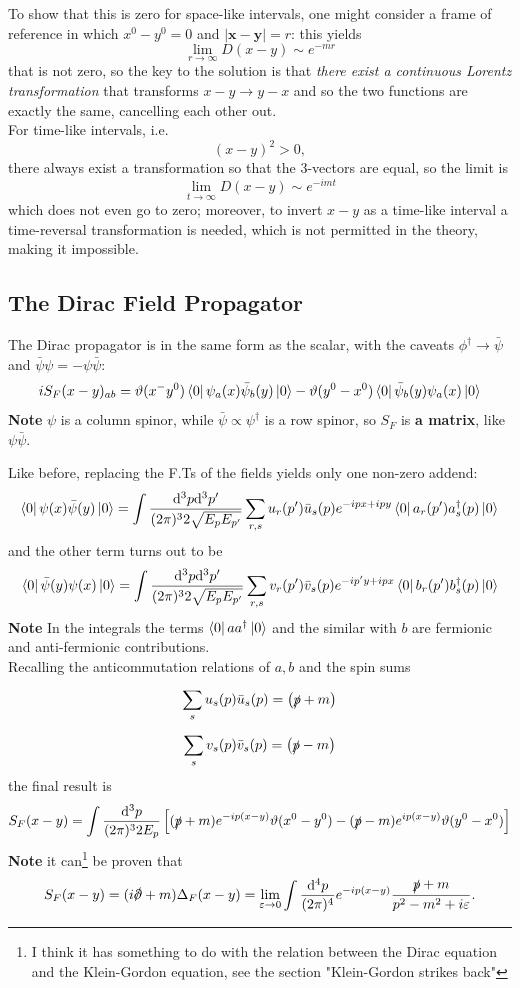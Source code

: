 To show that this is zero for space-like intervals, one might consider a frame of
reference in which $x^0-y^0=0$ and $|\mathbf{x-y}| = r$: this yields
$$\lim\limits_{r\to\infty}D(x-y)\sim e^{-mr}$$
that is not zero, so the key to the solution is that \textit{there exist a
continuous Lorentz transformation} that transforms $x-y \to y-x$ and so the
two functions are exactly the same, cancelling each other out.\\

For time-like intervals, i.e.
$$(x-y)^2>0,$$
there always exist a transformation so that the 3-vectors are equal, so the limit
is
$$\lim\limits_{t\to\infty}D(x-y)\sim e^{-imt}$$
which does not even go to zero; moreover, to invert $x-y$ as a time-like interval
a time-reversal transformation is needed, which is not permitted in the theory,
making it impossible.
\subsection{The Dirac Field Propagator}
The Dirac propagator is in the same form as the scalar, with the caveats
$\phi^\dagger\to\bar\psi$ and $\bar\psi\psi = -\psi\bar\psi$:
$$iS_F(x-y)_{ab} = \vartheta(x^-y^0)\bra{0}\psi_a(x)\bar\psi_b(y)\ket{0} - 
\vartheta(y^0-x^0)\bra{0}\bar\psi_b(y)\psi_a(x)\ket{0}$$
\textbf{Note} $\psi$ is a column spinor, while $\bar\psi\propto\psi^\dagger$ is
a row spinor, so $S_F$ is \textbf{a matrix}, like $\psi\bar\psi$.

Like before, replacing the F.Ts of the fields yields only one non-zero addend:
$$\bra{0}\psi(x)\bar\psi(y)\ket{0} =
\int \frac{\dd^3p\dd^3p'}{(2\pi)^32\sqrt{E_pE_{p'}}}\sum_{r,s}^{} u_r(p')\bar 
u_s(p)e^{-ipx+ipy}\bra{0}a_r(p')a_s^\dagger(p)\ket{0}
$$
and the other term turns out to be
$$\bra{0}\bar\psi(y)\psi(x)\ket{0} = \int \frac{\dd^3p\dd^3p'}{(2\pi)^32\sqrt{E_p
E_{p'}}}\sum_{r,s}^{}v_r(p')\bar v_s(p)e^{-ip'y+ipx}\bra{0}b_r(p')b_s^\dagger(p)
\ket{0}$$
\textbf{Note} In the integrals the terms $\bra{0}aa^\dagger\ket{0}$ and the similar
with $b$ are fermionic and anti-fermionic contributions.
\\Recalling the anticommutation relations of $a,b$ and the spin sums
$$\sum_{s}^{}u_s(p)\bar u_s(p) = \left(\slashed{p}+m\right)$$
$$\sum_{s}^{}v_s(p)\bar v_s(p) = \left(\slashed{p}-m\right)$$
the final result is
$$S_F(x-y) = \int \frac{\dd^3p}{(2\pi)^32E_p}\left[(\slashed{p}+m)e^{-ip(x-y)}
\vartheta(x^0-y^0) - (\slashed{p}-m)e^{ip(x-y)}\vartheta(y^0-x^0)\right]$$
\textbf{Note} it can\footnote{
I think it has something to do with the relation between the Dirac equation and
the Klein-Gordon equation, see the section "Klein-Gordon strikes back"
} be proven that
$$S_F(x-y) = (i\slashed{\pd}+m)\Delta_F(x-y)=
\lim\limits_{\varepsilon\to0}\int \frac{\dd^4p}{(2\pi)^4}e^{-ip(x-y)}
\frac{\slashed{p}+m}{p^2-m^2+i\varepsilon}.$$




